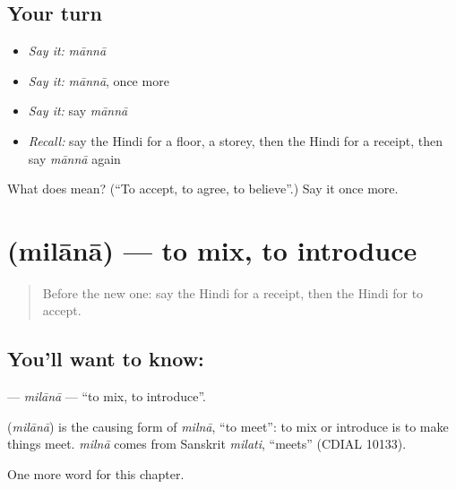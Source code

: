 \subsection*{Your turn}
\begin{itemize}
\raggedright
  \item \emph{Say it:} \emph{mānnā}
  \item \emph{Say it:} \emph{mānnā}, once more
  \item \emph{Say it:} say \emph{mānnā}
  \item \emph{Recall:} say the Hindi for a floor, a storey, then the Hindi for a receipt, then say \emph{mānnā} again
\end{itemize}

\begin{tcolorbox}[breakable,colback=teal!4,colframe=teal!35!black,title={Before you move on}]
What does  mean? (\textquotedblleft{}To accept, to agree, to believe\textquotedblright{}.) Say it once more.
\end{tcolorbox}
\section[\texorpdfstring{\hi{मिलाना} (milānā)}{मिलाना (milānā)}]{ (milānā) — to mix, to introduce}

\label{lesson:HI-C168-milana}



\begin{quote}
Before the new one: say the Hindi for a receipt, then the Hindi for to accept.
\end{quote}

\subsection*{You'll want to know: }
\textbf{} — \emph{milānā} — \textquotedblleft{}to mix, to introduce\textquotedblright{}.

\begin{cousinweb}
\textbf{} (\emph{milānā}) is the causing form of \emph{milnā}, \textquotedblleft{}to meet\textquotedblright{}: to mix or introduce is to make things meet. \emph{milnā} comes from Sanskrit \emph{milati}, \textquotedblleft{}meets\textquotedblright{} (CDIAL 10133).
\end{cousinweb}

\begin{grammarlens}[title={What you've built}]
One more word for this chapter.
\end{grammarlens}

